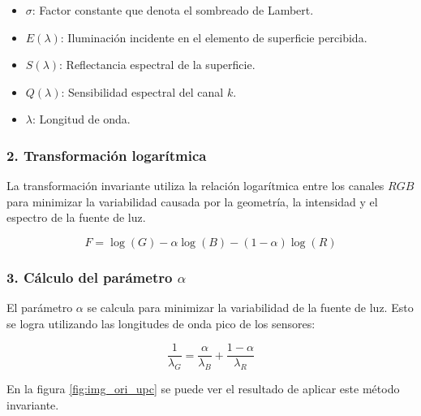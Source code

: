 \begin{itemize}
\setlength{\itemsep}{-1ex}
   \item{\begin{flushleft} $\sigma$: Factor constante que denota el sombreado de Lambert. \end{flushleft}}
   \item{\begin{flushleft} $E(\lambda )$: Iluminación incidente en el elemento de superficie percibida. \end{flushleft}}
   \item{\begin{flushleft} $S(\lambda )$: Reflectancia espectral de la superficie. \end{flushleft}}
   \item{\begin{flushleft} $Q(\lambda )$: Sensibilidad espectral del canal $k$. \end{flushleft}}
   \item{\begin{flushleft} $\lambda$: Longitud de onda. \end{flushleft}}
\end{itemize}

\subsubsection{2. Transformación logarítmica}

La transformación invariante utiliza la relación logarítmica entre los canales $RGB$ para minimizar la variabilidad causada por la geometría, la intensidad y el espectro de la fuente de luz.

$$F=\log (G)-\alpha \log (B)-(1-\alpha )\log (R)$$

\subsubsection{3. Cálculo del parámetro $\alpha$}

El parámetro $\alpha$ se calcula para minimizar la variabilidad de la fuente de luz. Esto se logra utilizando las longitudes de onda pico de los sensores:

$$\frac{1}{\lambda_G }=\frac{\alpha }{\lambda_B }+\frac{1-\alpha }{\lambda_R }$$

En la figura \ref{fig:img_ori_upc} se puede ver el resultado de aplicar este método invariante.

